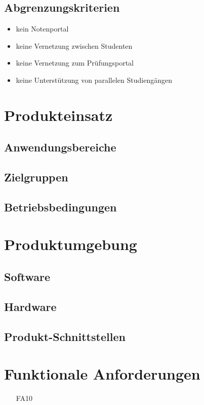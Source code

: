\documentclass[titlepage=true, parskip=full]{scrartcl}
\begin{document}
\subsection{Abgrenzungskriterien}
\begin{itemize}[nosep]
	\item kein Notenportal
	\item keine Vernetzung zwischen Studenten
	\item keine Vernetzung zum Prüfungsportal
	\item keine Unterstützung von parallelen Studiengängen
\end{itemize}
\section{Produkteinsatz}

\subsection{Anwendungsbereiche}

\subsection{Zielgruppen}

\subsection{Betriebsbedingungen}

\section{Produktumgebung}

\subsection{Software}

\subsection{Hardware}

\subsection{Produkt-Schnittstellen}

\section{Funktionale Anforderungen}
\begin{itemize}[nosep]
	\item[FA10]
\end{itemize}
\end{document}
